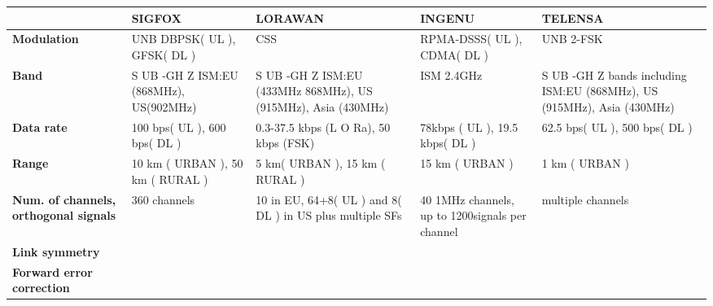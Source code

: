 \begin{table}[h!]
\scriptsize
	\begin{tabulary}{\textwidth}{L|L|L|L|L}
	\                                             & \textbf{SIGFOX}                               & \textbf{LORAWAN}                                              & \textbf{INGENU}                                 & \textbf{TELENSA} \\\hline                                                              
	\textbf{Modulation}                           & UNB DBPSK( UL ), GFSK( DL )                   & CSS                                                           & RPMA-DSSS( UL ), CDMA( DL )                     & UNB 2-FSK \\\hline                                                             
	\textbf{Band}                                 & S UB -GH Z ISM:EU (868MHz), US(902MHz)        & S UB -GH Z ISM:EU (433MHz 868MHz), US (915MHz), Asia (430MHz) & ISM 2.4GHz                                      & S UB -GH Z bands including ISM:EU (868MHz), US (915MHz), Asia (430MHz) \\\hline
	\textbf{Data rate}                            & 100 bps( UL ), 600 bps( DL )                  & 0.3-37.5 kbps (L O Ra), 50 kbps (FSK)                         & 78kbps ( UL ), 19.5 kbps( DL )                  & 62.5 bps( UL ), 500 bps( DL ) \\\hline                                         
	\textbf{Range}                                & 10 km ( URBAN ), 50 km ( RURAL )              & 5 km( URBAN ), 15 km ( RURAL )                                & 15 km ( URBAN )                                 & 1 km ( URBAN ) \\\hline                                                        
	\textbf{Num. of channels, orthogonal signals} & 360 channels                                  & 10 in EU, 64+8( UL ) and 8( DL ) in US plus multiple SFs      & 40 1MHz channels, up to 1200signals per channel & multiple channels \\\hline                                                     
	\textbf{Link symmetry}                        & \ko                                           & \ok                                                           & \ko                                             & \ko \\\hline                                                                   
	\textbf{Forward error correction}             & \ko                                           & \ok                                                           & \ok                                             & \ok \\\hline                                                                   

\end{tabulary}
\end{table}
